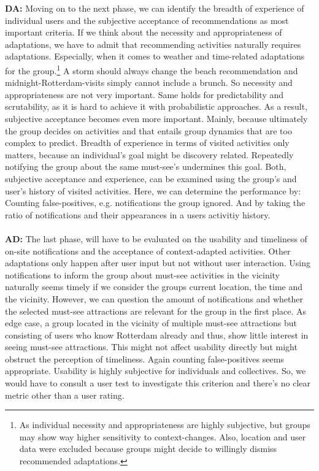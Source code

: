 \documentclass[11pt,a4paper,oneside]{article}
\begin{document}
\textbf{DA:} Moving on to the next phase, we can identify the breadth of experience of individual users and the subjective acceptance of recommendations as most important criteria. If we think about the necessity and appropriateness of adaptations, we have to admit that recommending activities naturally requires adaptations.\cite{CITE} Especially, when it comes to weather and time-related adaptations for the group.\footnote{As individual necessity and appropriateness are highly subjective, but groups may show way higher sensitivity to context-changes.\cite{CITE} Also, location and user data were excluded because groups might decide to willingly dismiss recommended adaptations.} A storm should always change the beach recommendation and midnight-Rotterdam-visits simply cannot include a brunch. So necessity and appropriateness are not very important. Same holds for predictability and scrutability, as it is hard to achieve it with probabilistic approaches. As a result, subjective acceptance becomes even more important. Mainly, because ultimately the group decides on activities and that entails group dynamics that are too complex to predict. Breadth of experience in terms of visited activities only matters, because an individual's goal might be discovery related. Repeatedly notifying the group about the same must-see's undermines this goal. Both, subjective acceptance and experience, can be examined using the group's and user's history of visited activities. Here, we can determine the performance by: Counting false-positives, e.g. notifications the group ignored. And by taking the ratio of notifications and their appearances in a users activitiy history.\\
\\
\textbf{AD:} The last phase, will have to be evaluated on the usability and timeliness of on-site notifications and the acceptance of context-adapted activities. Other adaptations only happen after user input but not without user interaction. Using notifications to inform the group about must-see activities in the vicinity naturally seems timely if we consider the groups current location, the time and the vicinity. However, we can question the amount of notifications and whether the selected must-see attractions are relevant for the group in the first place. As edge case, a group located in the vicinity of multiple must-see attractions but consisting of users who know Rotterdam already and thus, show little interest in seeing must-see attractions. This might not affect usability directly but might obstruct the perception of timeliness. Again counting false-positives seems appropriate. Usability is highly subjective for individuals and collectives. So, we would have to consult a user test to investigate this criterion and there's no clear metric other than a user rating. 
\end{document}
